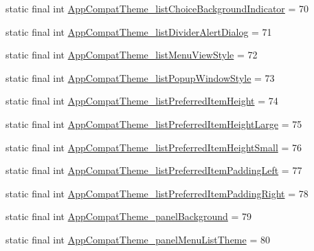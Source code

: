 \begin{DoxyCompactItemize}
\item 
static final int \mbox{\hyperlink{classandroid_1_1support_1_1v7_1_1appcompat_1_1R_1_1styleable_a60fbf3d8975c1e56e883d17ff05d98ad}{App\+Compat\+Theme\+\_\+list\+Choice\+Background\+Indicator}} = 70
\item 
static final int \mbox{\hyperlink{classandroid_1_1support_1_1v7_1_1appcompat_1_1R_1_1styleable_aae9d405e90740f2f6f987955feaa32f2}{App\+Compat\+Theme\+\_\+list\+Divider\+Alert\+Dialog}} = 71
\item 
static final int \mbox{\hyperlink{classandroid_1_1support_1_1v7_1_1appcompat_1_1R_1_1styleable_a4ff65c3e1b1be5e23858db62f145d10c}{App\+Compat\+Theme\+\_\+list\+Menu\+View\+Style}} = 72
\item 
static final int \mbox{\hyperlink{classandroid_1_1support_1_1v7_1_1appcompat_1_1R_1_1styleable_a0a5b73e4553fdefa53e1fa4a369ce301}{App\+Compat\+Theme\+\_\+list\+Popup\+Window\+Style}} = 73
\item 
static final int \mbox{\hyperlink{classandroid_1_1support_1_1v7_1_1appcompat_1_1R_1_1styleable_ad99b1fc557ff371142217308a4145277}{App\+Compat\+Theme\+\_\+list\+Preferred\+Item\+Height}} = 74
\item 
static final int \mbox{\hyperlink{classandroid_1_1support_1_1v7_1_1appcompat_1_1R_1_1styleable_a8e35868188c499d99123afea2d2d8bea}{App\+Compat\+Theme\+\_\+list\+Preferred\+Item\+Height\+Large}} = 75
\item 
static final int \mbox{\hyperlink{classandroid_1_1support_1_1v7_1_1appcompat_1_1R_1_1styleable_a09953a6247da1828a0a8951d716f0f28}{App\+Compat\+Theme\+\_\+list\+Preferred\+Item\+Height\+Small}} = 76
\item 
static final int \mbox{\hyperlink{classandroid_1_1support_1_1v7_1_1appcompat_1_1R_1_1styleable_a6b1c55e5a463f9a77c6666042d507197}{App\+Compat\+Theme\+\_\+list\+Preferred\+Item\+Padding\+Left}} = 77
\item 
static final int \mbox{\hyperlink{classandroid_1_1support_1_1v7_1_1appcompat_1_1R_1_1styleable_ac45d9e166bf94d921a4fc7fa030ccac4}{App\+Compat\+Theme\+\_\+list\+Preferred\+Item\+Padding\+Right}} = 78
\item 
static final int \mbox{\hyperlink{classandroid_1_1support_1_1v7_1_1appcompat_1_1R_1_1styleable_a5ad68b26ca37d9c63dd5f687d2663c47}{App\+Compat\+Theme\+\_\+panel\+Background}} = 79
\item 
static final int \mbox{\hyperlink{classandroid_1_1support_1_1v7_1_1appcompat_1_1R_1_1styleable_a889b79e456e07e7442abe6d695c4bc4e}{App\+Compat\+Theme\+\_\+panel\+Menu\+List\+Theme}} = 80

\end{DoxyCompactItemize}
